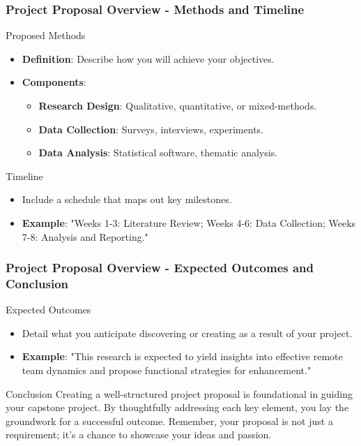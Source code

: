 \documentclass[aspectratio=169]{beamer}
\begin{document}
\begin{frame}[fragile]
    \frametitle{Project Proposal Overview - Methods and Timeline}
    \begin{block}{Proposed Methods}
        \begin{itemize}
            \item \textbf{Definition}: Describe how you will achieve your objectives.
            \item \textbf{Components}:
            \begin{itemize}
                \item \textbf{Research Design}: Qualitative, quantitative, or mixed-methods.
                \item \textbf{Data Collection}: Surveys, interviews, experiments.
                \item \textbf{Data Analysis}: Statistical software, thematic analysis.
            \end{itemize}
        \end{itemize}
    \end{block}

    \begin{block}{Timeline}
        \begin{itemize}
            \item Include a schedule that maps out key milestones.
            \item \textbf{Example}: "Weeks 1-3: Literature Review; Weeks 4-6: Data Collection; Weeks 7-8: Analysis and Reporting."
        \end{itemize}
    \end{block}
\end{frame}

\begin{frame}[fragile]
    \frametitle{Project Proposal Overview - Expected Outcomes and Conclusion}
    \begin{block}{Expected Outcomes}
        \begin{itemize}
            \item Detail what you anticipate discovering or creating as a result of your project.
            \item \textbf{Example}: "This research is expected to yield insights into effective remote team dynamics and propose functional strategies for enhancement."
        \end{itemize}
    \end{block}

    \begin{block}{Conclusion}
        Creating a well-structured project proposal is foundational in guiding your capstone project. By thoughtfully addressing each key element, you lay the groundwork for a successful outcome. Remember, your proposal is not just a requirement; it’s a chance to showcase your ideas and passion.
    \end{block}
\end{frame}
\end{document}
